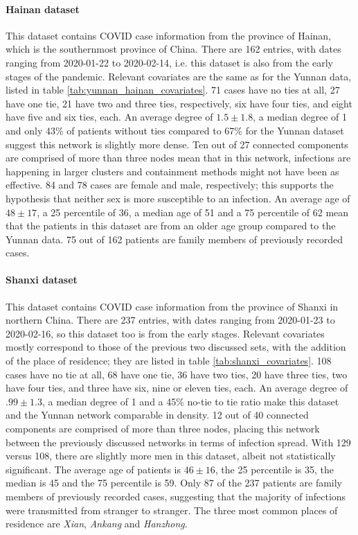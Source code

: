\documentclass{article}
\begin{document}
	\paragraph{Hainan dataset} This dataset contains COVID case information from the province of Hainan, which is the southernmost province of China. There are 162 entries, with dates ranging from 2020-01-22 to 2020-02-14, i.e. this dataset is also from the early stages of the pandemic. Relevant covariates are the same as for the Yunnan data, listed in table \ref{tab:yunnan_hainan_covariates}. 71 cases have no ties at all, 27 have one tie, 21 have two and three ties, respectively, six have four ties, and eight have five and six ties, each. An average degree of $1.5\pm1.8$, a median degree of 1 and only 43\% of patients without ties compared to 67\% for the Yunnan dataset suggest this network is slightly more dense. Ten out of 27 connected components are comprised of more than three nodes mean that in this network, infections are happening in larger clusters and containment methods might not have been as effective. 84 and 78 cases are female and male, respectively; this supports the hypothesis that neither sex is more susceptible to an infection. An average age of $48\pm17$, a 25 percentile of 36, a median age of 51 and a 75 percentile of 62 mean that the patients in this dataset are from an older age group compared to the Yunnan data. 75 out of 162 patients are family members of previously recorded cases.
	
	\paragraph{Shanxi dataset} This dataset contains COVID case information from the province of Shanxi in northern China. There are 237 entries, with dates ranging from 2020-01-23 to 2020-02-16, so this dataset too is from the early stages. Relevant covariates mostly correspond to those of the previous two discussed sets, with the addition of the place of residence; they are listed in table \ref{tab:shanxi_covariates}. 108 cases have no tie at all, 68 have one tie, 36 have two ties, 20 have three ties, two have four ties, and three have six, nine or eleven ties, each. An average degree of $.99\pm1.3$, a median degree of 1 and a 45\% no-tie to tie ratio make this dataset and the Yunnan network comparable in density. 12 out of 40 connected components are comprised of more than three nodes, placing this network between the previously discussed networks in terms of infection spread. With 129 versus 108, there are slightly more men in this dataset, albeit not statistically significant. The average age of patients is $46\pm16$, the 25 percentile is 35, the median is 45 and the 75 percentile is 59. Only 87 of the 237 patients are family members of previously recorded cases, suggesting that the majority of infections were transmitted from stranger to stranger. The three most common places of residence are \emph{Xian}, \emph{Ankang} and \emph{Hanzhong}.
	
\end{document}
